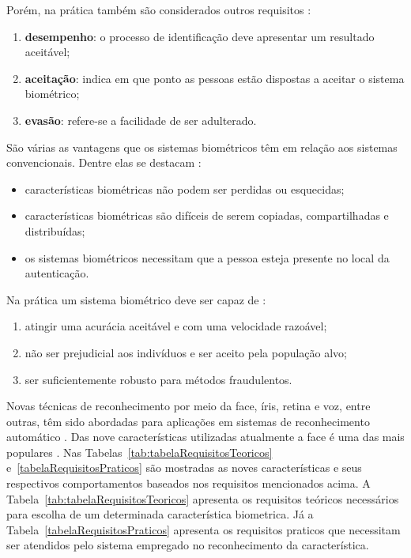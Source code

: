 	Porém, na prática também são considerados outros requisitos \cite{milene}:

	\begin{enumerate}
		\item \textbf{desempenho}: o processo de identificação deve apresentar um resultado aceitável;
		\item \textbf{aceitação}: indica em que ponto as pessoas estão dispostas a aceitar o sistema biométrico;
		\item \textbf{evasão}: refere-se a facilidade de ser adulterado.
	\end{enumerate}

	São várias as vantagens que os sistemas biométricos têm em relação aos sistemas
	convencionais. Dentre elas se destacam \cite{drovetto}:
		
	\begin{itemize}
		\item características biométricas não podem ser perdidas ou esquecidas;
		\item características biométricas são difíceis de serem copiadas, compartilhadas e distribuídas;
		\item os sistemas biométricos necessitam que a pessoa esteja presente no local
		da autenticação.
	\end{itemize}

	Na prática um sistema biométrico deve ser capaz de \cite{hong}:
		
	\begin{enumerate}
		\item atingir uma acurácia aceitável e com uma velocidade razoável;
		\item não ser prejudicial aos indivíduos e ser aceito pela população alvo;
		\item ser suficientemente robusto para métodos fraudulentos.
	\end{enumerate}

	Novas técnicas de reconhecimento por meio da face, íris, retina e voz, entre
	outras, têm sido abordadas para aplicações em sistemas de reconhecimento
	automático \cite{bolle,saocarlos}. Das nove características utilizadas
	atualmente a face é uma das mais populares \cite{milene}. Nas
	Tabelas~\ref{tab:tabelaRequisitosTeoricos} e~\ref{tabelaRequisitosPraticos} são
	mostradas as noves características e seus respectivos comportamentos baseados
	nos requisitos mencionados acima. A Tabela~\ref{tab:tabelaRequisitosTeoricos}
	apresenta os requisitos teóricos necessários para escolha de um determinada
	característica biometrica. Já a Tabela~\ref{tabelaRequisitosPraticos} apresenta
	os requisitos praticos que necessitam ser atendidos pelo sistema empregado no
	reconhecimento da característica.
		
